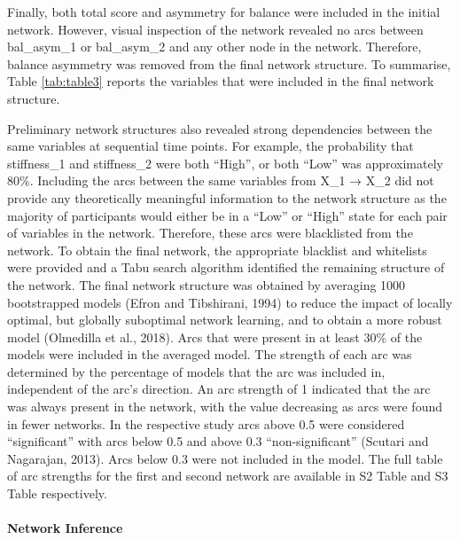 \documentclass[
]{frontiersHLTH}
\begin{document}
Finally, both total score and asymmetry for balance were included in the
initial network. However, visual inspection of the network revealed no
arcs between bal\_asym\_1 or bal\_asym\_2 and any other node in the
network. Therefore, balance asymmetry was removed from the final network
structure. To summarise, Table \ref{tab:table3} reports the variables
that were included in the final network structure.

Preliminary network structures also revealed strong dependencies between
the same variables at sequential time points. For example, the
probability that stiffness\_1 and stiffness\_2 were both ``High'', or
both ``Low'' was approximately 80\%. Including the arcs between the same
variables from X\_1 → X\_2 did not provide any theoretically meaningful
information to the network structure as the majority of participants
would either be in a ``Low'' or ``High'' state for each pair of
variables in the network. Therefore, these arcs were blacklisted from
the network. To obtain the final network, the appropriate blacklist and
whitelists were provided and a Tabu search algorithm identified the
remaining structure of the network. The final network structure was
obtained by averaging 1000 bootstrapped models (Efron and Tibshirani,
1994) to reduce the impact of locally optimal, but globally suboptimal
network learning, and to obtain a more robust model (Olmedilla et al.,
2018). Arcs that were present in at least 30\% of the models were
included in the averaged model. The strength of each arc was determined
by the percentage of models that the arc was included in, independent of
the arc's direction. An arc strength of 1 indicated that the arc was
always present in the network, with the value decreasing as arcs were
found in fewer networks. In the respective study arcs above 0.5 were
considered ``significant'' with arcs below 0.5 and above 0.3
``non-significant'' (Scutari and Nagarajan, 2013). Arcs below 0.3 were
not included in the model. The full table of arc strengths for the first
and second network are available in S2 Table and S3 Table respectively.

\hypertarget{network-inference}{%
\paragraph{Network Inference}\label{network-inference}}
\end{document}
